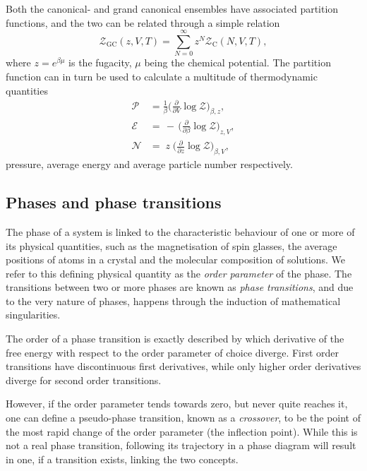 Both the canonical- and grand canonical ensembles have associated partition
functions, and the two can be related through a simple relation
%
\begin{equation}
  \mathcal{Z}_{\text{GC}}(z, V, T) = \sum_{N=0}^{\infty} z^N \mathcal{Z}_{\text{C}}(N, V, T),
\end{equation}
%
where $z = e^{\beta \mu}$ is the fugacity, $\mu$ being the chemical
potential. The partition function can in turn be used to calculate a multitude
of thermodynamic quantities
%
\begin{align}
  \mathcal{P} &= \frac{1}{\beta} \bigg( \frac{\partial}{\partial V} \log \mathcal{Z}
    \bigg)_{\beta,z}, \\
  \mathcal{E} &= \,\minus\, \bigg( \frac{\partial}{\partial \beta}
    \log \mathcal{Z} \bigg)_{z,V}, \\
  \mathcal{N} &= \;z\; \bigg( \frac{\partial}{\partial z}
    \log \mathcal{Z} \bigg)_{\beta,V},
\end{align}
%
pressure, average energy and average particle number respectively.

\subsection{Phases and phase transitions}

The phase of a system is linked to the characteristic behaviour of one or more
of its physical quantities, such as the magnetisation of spin glasses, the
average positions of atoms in a crystal and the molecular composition of
solutions. We refer to this defining physical quantity as the
\emph{order parameter} of the phase.  The transitions between two or more phases
are known as \emph{phase transitions}, and due to the very nature of phases,
happens through the induction of mathematical singularities. 

The order of a phase transition is exactly described by which derivative of the
free energy with respect to the order parameter of choice diverge. First order
transitions have discontinuous first derivatives, while only higher order
derivatives diverge for second order transitions.

However, if the order parameter tends towards zero, but never quite reaches it,
one can define a pseudo-phase transition, known as a \emph{crossover}, to be the
point of the most rapid change of the order parameter (the inflection point).
While this is not a real phase transition, following its trajectory in a phase
diagram will result in one, if a transition exists, linking the two concepts.

